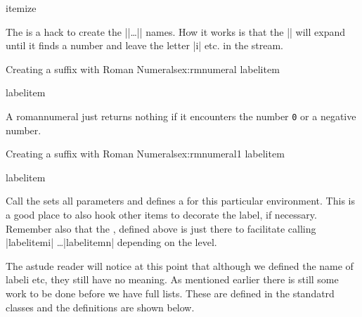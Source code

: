 \begin{texcode}{}{}
\begin{docEnvironment}{itemize}{}
\end{docEnvironment}


     \begin{teX}
\def\itemize{%
  \ifnum \@itemdepth >\thr@@\@toodeep\else
    \advance\@itemdepth\@ne
    \edef\@itemitem{labelitem\romannumeral\the\@itemdepth}%
    \end{teX}

The  is a hack to create the |\@itemi|\ldots|\@itemv| names. How it works is that the
|\romannumeral| will expand until it finds a number and leave the letter |i| etc. in the stream.

\begin{texexample}{Creating a suffix with Roman Numerals}{ex:rmnumeral}
\setcounter{tempcounter}{5}
\edef\itemtest{labelitem\romannumeral\thetempcounter}
\meaning\itemtest

\itemtest
\end{texexample}
    
    
A romannumeral just returns nothing if it encounters the number \texttt{0} or a negative number. 

\begin{texexample}{Creating a suffix with Roman Numerals}{ex:rmnumeral1}
\setcounter{tempcounter}{0}
\edef\itemtest{labelitem\romannumeral\thetempcounter}
\meaning\itemtest\par
\itemtest
\end{texexample}
    
    
Call the  sets all parameters and defines a   for this particular
environment. This is a good place to also hook other items to decorate the label, if necessary.
Remember also that the , defined above is just there to facilitate  
calling |labelitemi| \ldots |labelitemn| depending on the level.

    \begin{teXXX}
    \expandafter
    \list
      
      \csname\@itemitem\endcsname
      {\def\makelabel##1{\hss\llap{##1}}}%
  \fi}
    \end{teXXX}

The astude reader will notice at this point that although we defined the name of labeli etc, they still have no meaning. As mentioned earlier there is still some work to be done before we have full lists. These are defined in the standatrd classes and the definitions are shown below.


\end{texcode}
